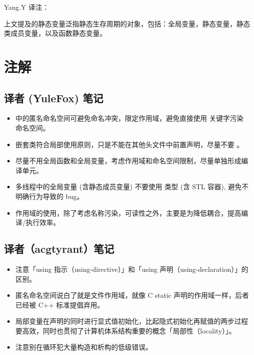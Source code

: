\begin{DNote}
  Yang.Y 译注：

  上文提及的静态变量泛指静态生存周期的对象，包括：全局变量，静态变量，静态类成员变量，以及函数静态变量。
\end{DNote}

\section{注解}

\subsection{ 译者 (YuleFox) 笔记}

\begin{itemize}
  \item {} 中的匿名命名空间可避免命名冲突，限定作用域，避免直接使用  关键字污染命名空间。
  \item 嵌套类符合局部使用原则，只是不能在其他头文件中前置声明，尽量不要 。
  \item 尽量不用全局函数和全局变量，考虑作用域和命名空间限制，尽量单独形成编译单元。
  \item 多线程中的全局变量 (含静态成员变量) 不要使用  类型 (含 STL 容器), 避免不明确行为导致的 bug。
  \item 作用域的使用，除了考虑名称污染，可读性之外，主要是为降低耦合，提高编译/执行效率。
\end{itemize}

\subsection{  译者（acgtyrant）笔记 }

\begin{itemize}
  \item 注意「using 指示（using-directive）」和「using 声明（using-declaration）」的区别。
  \item 匿名命名空间说白了就是文件作用域，就像 C static 声明的作用域一样，后者已经被 C++ 标准提倡弃用。
  \item 局部变量在声明的同时进行显式值初始化，比起隐式初始化再赋值的两步过程要高效，同时也贯彻了计算机体系结构重要的概念「局部性（locality）」。
  \item 注意别在循环犯大量构造和析构的低级错误。
\end{itemize}